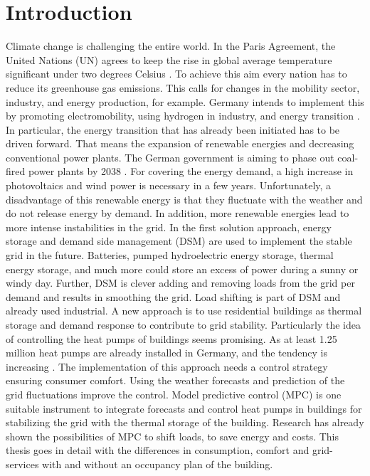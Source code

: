 \chapter{Introduction}
\label{ch:introduction}
Climate change is challenging the entire world. In the Paris Agreement, the United Nations (UN)  agrees to keep the rise in global average temperature significant under two degrees Celsius \cite{UnitedNations.2015}. To achieve this aim every nation has to reduce its greenhouse gas emissions. This calls for changes in the mobility sector, industry, and energy production, for example. Germany intends to implement this by promoting electromobility, using hydrogen in industry, and energy transition \cite{Deutschlandfunk.24.06.2021}. In particular, the energy transition that has already been initiated has to be driven forward. That means the expansion of renewable energies and decreasing conventional power plants. The German government is aiming to phase out coal-fired power plants by 2038 \cite{bundesregierung.2021}. For covering the energy demand, a high increase in photovoltaics and wind power is necessary in a few years. 
\newline
Unfortunately, a disadvantage of this renewable energy is that they fluctuate with the weather and do not release energy by demand. In addition, more renewable energies lead to more intense instabilities in the grid. In the first solution approach, energy storage and demand side management (DSM)  are used to implement the stable grid in the future. Batteries, pumped hydroelectric energy storage, thermal energy storage, and much more could store an excess of power during a sunny or windy day. Further, DSM is clever adding and removing loads from the grid per demand and results in smoothing the grid. Load shifting is part of DSM \cite{Gellings.1985} and already used industrial. A new approach is to use residential buildings as thermal storage and demand response to contribute to grid stability. Particularly the idea of controlling the heat pumps of buildings seems promising. As at least 1.25 million heat pumps are already installed in Germany, and the tendency is increasing \cite{BMW.2021}.
\newline
The implementation of this approach needs a control strategy ensuring consumer comfort. Using the weather forecasts and prediction of the grid fluctuations improve the control. Model predictive control (MPC)  is one suitable instrument to integrate forecasts and control heat pumps in buildings for stabilizing the grid with the thermal storage of the building. Research has already shown the possibilities of MPC to shift loads, to save energy and costs. This thesis goes in detail with the differences in consumption, comfort and grid-services with and without an occupancy plan of the building.

